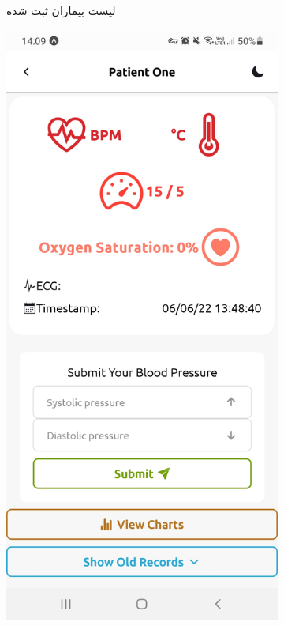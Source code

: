 \begin{figure}[H]
\begin{center}
\begin{subfigure}{.24\textwidth}
			\caption{لیست بیماران ثبت شده}
			\label{patients}
		\end{subfigure}
		\begin{subfigure}{.24\textwidth}
			\includegraphics[width=.95\linewidth]{figs/app_records}

\end{subfigure}
\end{center}
\end{figure}
